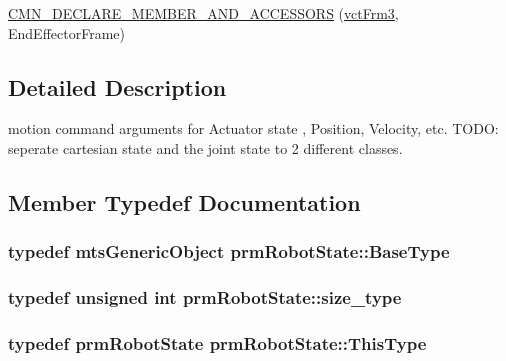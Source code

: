 {\bf }\par
\begin{DoxyCompactItemize}
\item 
\hyperlink{classprm_robot_state_a1c5c8244ace0caeb58700415253a892a}{C\-M\-N\-\_\-\-D\-E\-C\-L\-A\-R\-E\-\_\-\-M\-E\-M\-B\-E\-R\-\_\-\-A\-N\-D\-\_\-\-A\-C\-C\-E\-S\-S\-O\-R\-S} (\hyperlink{vct_transformation_types_8h_a81feda0a02c2d1bc26e5553f409fed20}{vct\-Frm3}, End\-Effector\-Frame)
\end{DoxyCompactItemize}



\subsection{Detailed Description}
motion command arguments for Actuator state , Position, Velocity, etc. T\-O\-D\-O\-: seperate cartesian state and the joint state to 2 different classes. 

\subsection{Member Typedef Documentation}
\hypertarget{classprm_robot_state_a602400b6ea7b54575290cc5207fc0167}{
\subsubsection[{Base\-Type}]{\setlength{\rightskip}{0pt plus 5cm}typedef {\bf mts\-Generic\-Object} {\bf prm\-Robot\-State\-::\-Base\-Type}}}\label{classprm_robot_state_a602400b6ea7b54575290cc5207fc0167}
\hypertarget{classprm_robot_state_a2cf2c739d5b3cdd3f9d44e2878183d90}{
\subsubsection[{size\-\_\-type}]{\setlength{\rightskip}{0pt plus 5cm}typedef unsigned int {\bf prm\-Robot\-State\-::size\-\_\-type}}}\label{classprm_robot_state_a2cf2c739d5b3cdd3f9d44e2878183d90}
\hypertarget{classprm_robot_state_ae29f0a2f1d1f44400da6e8191bc06475}{
\subsubsection[{This\-Type}]{\setlength{\rightskip}{0pt plus 5cm}typedef {\bf prm\-Robot\-State} {\bf prm\-Robot\-State\-::\-This\-Type}}}\label{classprm_robot_state_ae29f0a2f1d1f44400da6e8191bc06475}


